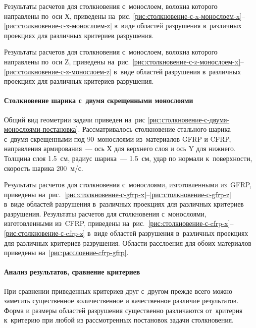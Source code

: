 \documentclass[thesis.tex]{subfiles}
\begin{document}

Результаты расчетов для столкновения с~монослоем, волокна которого направлены по~оси Х, приведены на~рис.
\ref{рис:столкновение-с-x-монослоем-x}--\ref{рис:столкновение-с-x-монослоем-z} в~виде областей разрушения в~различных
проекциях для различных критериев разрушения.

Результаты расчетов для столкновения с~монослоем, волокна которого направлены по~оси Z, приведены на~рис.
\ref{рис:столкновение-с-z-монослоем-x}--\ref{рис:столкновение-с-z-монослоем-z} в~виде областей разрушения в~различных
проекциях для различных критериев разрушения.


\paragraph{Столкновение шарика с~двумя скрещенными монослоями}

Общий вид геометрии задачи приведен на~рис \ref{рис:столкновение-с-двумя-монослоями-постановка}. Рассматривалось
столкновение стального шарика с~двумя скрещенными под 90\degree\ монослоями из~материалов GFRP и CFRP, направления
армирования~--- ось Х для верхнего слоя и ось Y для нижнего. Толщина слоя 1.5~см, радиус шарика~--- 1.5~см, удар по
нормали к~поверхности, скорость шарика 200~м/с.


Результаты расчетов для столкновения с~монослоями, изготовленными из~GFRP, приведены
на~рис.~\ref{рис:столкновение-с-gfrp-x}--\ref{рис:столкновение-с-gfrp-z} в~виде областей разрушения в~различных
проекциях для различных критериев разрушения. Результаты расчетов для столкновения с~монослоями, изготовленными из~CFRP,
приведены на~рис.~\ref{рис:столкновение-с-cfrp-x}--\ref{рис:столкновение-с-cfrp-z} в~виде областей разрушения
в~различных проекциях для различных критериев разрушения. Области расслоения для обоих материалов приведены на~\ref{рис:расслоение-cfrp-gfrp}.


\paragraph{Анализ результатов, сравнение критериев}
При сравнении приведенных критериев друг с~другом прежде всего можно заметить существенное количественное и качественное
различие результатов. Форма и размеры областей разрушения существенно различаются от~критерия к~критерию при любой из
рассмотренных постановок задачи столкновения.
\end{document}

